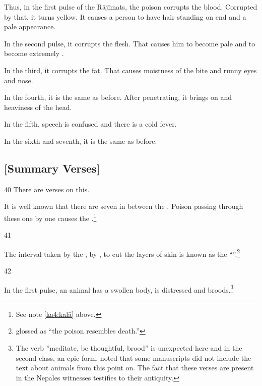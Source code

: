 \begin{translation}
Thus, in the first pulse of the Rājīmats, the poison corrupts the blood. 
Corrupted by that, it turns yellow.  It causes a person to have hair standing on 
end and a pale appearance. 

In the second pulse, it corrupts the flesh. That causes him to become pale and to 
become extremely .

In the third, it corrupts the fat.  That causes moistness of the bite and runny eyes 
and nose. 

In the fourth, it is the same as before.  After penetrating, it brings on 
 and heaviness of the head.

In the fifth, speech is confused and there is a cold fever.

In the sixth and seventh, it is the same as before. 


\subsection{[Summary Verses]}

\item[40]
There are verses on this.

\begin{sloka}
It is well known that there are seven  in
between the .  Poison passing through these one
by one causes the .\footnote{See note \ref{ka4:kalā}
    above.}
\end{sloka}


\item[41]
\begin{sloka}
The interval taken by the ,  by , to cut the layers of 
    skin is
known as the “”.\footnote{ glossed  as
     “the poison resembles death.”}
\end{sloka}


\item[42]

\begin{sloka}
    In the first pulse, an animal has a swollen body, is distressed and
broods.\footnote{The verb \root{} ”meditate, be
    thoughtful, brood” is unexpected here and in the  second class, an
    epic form.  noted that some manuscripts did not
    include the text about animals from this point on.  The fact that
    these verses are present in the Nepales witnesses testifies to their
    antiquity.}
    

\end{sloka}
\end{translation}
